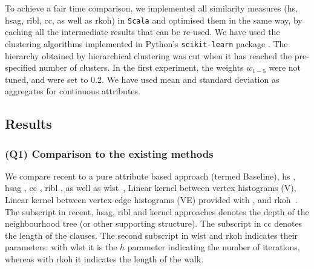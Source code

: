 To achieve a fair time comparison, we implemented all similarity measures (\gls{hs}, \gls{hsag}, \gls{ribl}, \gls{cc}, as well as \gls{rkoh}) in \texttt{Scala} and optimised them in the same way, by caching all the intermediate results that can be re-used.
We have used the clustering algorithms implemented in Python's \texttt{scikit-learn} package \cite{scikit-learn}.
The hierarchy obtained by hierarchical clustering was cut when it has reached the pre-specified number of clusters.
In the first experiment, the weights $w_{1-5}$ were not tuned, and were set to 0.2.
We have used mean and standard deviation as aggregates for continuous attributes.






\subsection{Results}
\label{sec:ResultsSub}



\subsubsection{\textbf{(Q1) Comparison to the existing methods}}

We compare \gls{recent} to a pure attribute based approach (termed Baseline), \gls{hs} \cite{Neville03clusteringrelational}, \gls{hsag} \cite{WitsenburgB11a}, \gls{cc} \cite{Fonseca2012}, \gls{ribl} \cite{RIBL96}, as well as \gls{wlst}~\cite{shervashidze09fastsubtree}, Linear kernel between vertex histograms (V), Linear kernel between vertex-edge histograms (VE) provided with \cite{NIPS2015_5688}, and \gls{rkoh}~\cite{WachmanK07}.
The subscript in \gls{recent}, \gls{hsag}, \gls{ribl} and kernel approaches  denotes the depth of the neighbourhood tree (or other supporting structure).
The subscript in \gls{cc} denotes the length of the clauses.
The second subscript in \gls{wlst} and \gls{rkoh} indicates their parameters: with \gls{wlst} it is the $h$ parameter indicating the number of iterations, whereas with \gls{rkoh} it indicates the length of the walk.

